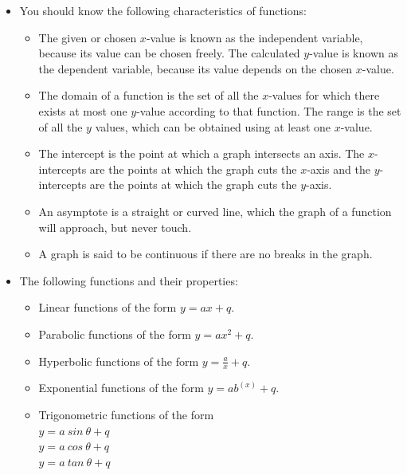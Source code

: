 \summary

\begin{itemize}[noitemsep]
\item You should know the following characteristics of functions: 
\begin{itemize}[noitemsep]
\item The given or chosen $x$-value is known as the independent variable, because its value can be chosen freely. The calculated $y$-value is known as the dependent variable, because its value depends on the chosen $x$-value.
\item The domain of a function is the set of all the $x$-values for which there exists at most one $y$-value according to that function. The range is the set of all the $y$ values, which can be obtained using at least one $x$-value.
\item The intercept is the point at which a graph intersects an axis. The $x$-intercepts are the points at which the graph cuts the $x$-axis and the $y$-intercepts are the points at which the graph cuts the $y$-axis. 
\item An asymptote is a straight or curved line, which the graph of a function will approach, but never touch.
\item A graph is said to be continuous if there are no breaks in the graph. 
\end{itemize}

\item  The following functions and their properties:
    \begin{itemize}[noitemsep]
    \item Linear functions of the form $y=ax+q$.
    \item Parabolic functions of the form $y=a{x}^{2}+q$. 
    \item Hyperbolic functions of the form $y=\frac{a}{x}+q$. 
    \item Exponential functions of the form $y=a{b}^{(x)}+q$. 
\item Trigonometric functions of the form \\$y=a~sin~\theta+q$ \\$y=a~cos~\theta+q$\\ $y=a~tan~\theta+q$ 
    \end{itemize}
\end{itemize}

